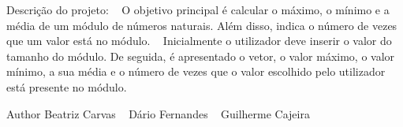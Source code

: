 Descrição do projeto\+: ~\newline
O objetivo principal é calcular o máximo, o mínimo e a média de um módulo de números naturais. Além disso, indica o número de vezes que um valor está no módulo. ~\newline
Inicialmente o utilizador deve inserir o valor do tamanho do módulo. De seguida, é apresentado o vetor, o valor máximo, o valor mínimo, a sua média e o número de vezes que o valor escolhido pelo utilizador está presente no módulo. ~\newline
 \begin{DoxyAuthor}{Author}
Beatriz Carvas ~\newline
 Dário Fernandes ~\newline
 Guilherme Cajeira 
\end{DoxyAuthor}
